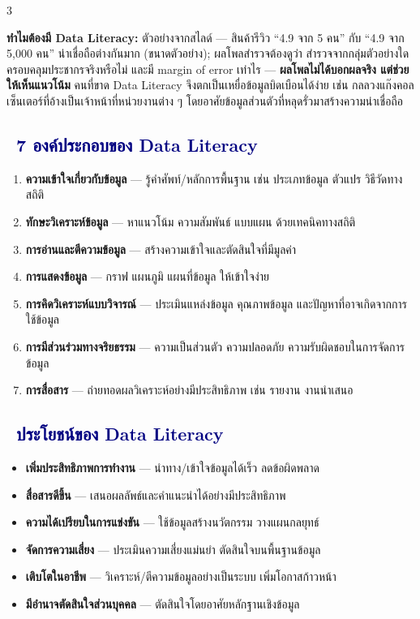 \documentclass[9pt]{extarticle}
\newcommand{\dist}[1]{\subsection*{\textcolor{navy}{\textbullet\ #1}}}
\begin{document}
\begin{multicols}{3}
\begin{ideabox}
\textbf{ทำไมต้องมี Data Literacy:} ตัวอย่างจากสไลด์ — สินค้ารีวิว ``4.9 จาก 5 คน'' กับ ``4.9 จาก 5{,}000 คน'' น่าเชื่อถือต่างกันมาก (ขนาดตัวอย่าง); ผลโพลสำรวจต้องดูว่า สำรวจจากกลุ่มตัวอย่างใด ครอบคลุมประชากรจริงหรือไม่ และมี margin of error เท่าไร — \textbf{ผลโพลไม่ได้บอกผลจริง แต่ช่วยให้เห็นแนวโน้ม} คนที่ขาด Data Literacy จึงตกเป็นเหยื่อข้อมูลบิดเบือนได้ง่าย เช่น กลลวงแก๊งคอลเซ็นเตอร์ที่อ้างเป็นเจ้าหน้าที่หน่วยงานต่าง ๆ โดยอาศัยข้อมูลส่วนตัวที่หลุดรั่วมาสร้างความน่าเชื่อถือ
\end{ideabox}

\dist{7 องค์ประกอบของ Data Literacy}
\begin{enumerate}
\item \textbf{ความเข้าใจเกี่ยวกับข้อมูล} — รู้คำศัพท์/หลักการพื้นฐาน เช่น ประเภทข้อมูล ตัวแปร วิธีวัดทางสถิติ
\item \textbf{ทักษะวิเคราะห์ข้อมูล} — หาแนวโน้ม ความสัมพันธ์ แบบแผน ด้วยเทคนิคทางสถิติ
\item \textbf{การอ่านและตีความข้อมูล} — สร้างความเข้าใจและตัดสินใจที่มีมูลค่า
\item \textbf{การแสดงข้อมูล} — กราฟ แผนภูมิ แผนที่ข้อมูล ให้เข้าใจง่าย
\item \textbf{การคิดวิเคราะห์แบบวิจารณ์} — ประเมินแหล่งข้อมูล คุณภาพข้อมูล และปัญหาที่อาจเกิดจากการใช้ข้อมูล
\item \textbf{การมีส่วนร่วมทางจริยธรรม} — ความเป็นส่วนตัว ความปลอดภัย ความรับผิดชอบในการจัดการข้อมูล
\item \textbf{การสื่อสาร} — ถ่ายทอดผลวิเคราะห์อย่างมีประสิทธิภาพ เช่น รายงาน งานนำเสนอ
\end{enumerate}

\dist{ประโยชน์ของ Data Literacy}
\begin{itemize}
\item \textbf{เพิ่มประสิทธิภาพการทำงาน} — นำทาง/เข้าใจข้อมูลได้เร็ว ลดข้อผิดพลาด
\item \textbf{สื่อสารดีขึ้น} — เสนอผลลัพธ์และคำแนะนำได้อย่างมีประสิทธิภาพ
\item \textbf{ความได้เปรียบในการแข่งขัน} — ใช้ข้อมูลสร้างนวัตกรรม วางแผนกลยุทธ์
\item \textbf{จัดการความเสี่ยง} — ประเมินความเสี่ยงแม่นยำ ตัดสินใจบนพื้นฐานข้อมูล
\item \textbf{เติบโตในอาชีพ} — วิเคราะห์/ตีความข้อมูลอย่างเป็นระบบ เพิ่มโอกาสก้าวหน้า
\item \textbf{มีอำนาจตัดสินใจส่วนบุคคล} — ตัดสินใจโดยอาศัยหลักฐานเชิงข้อมูล
\end{itemize}


\end{multicols}
\end{document}
